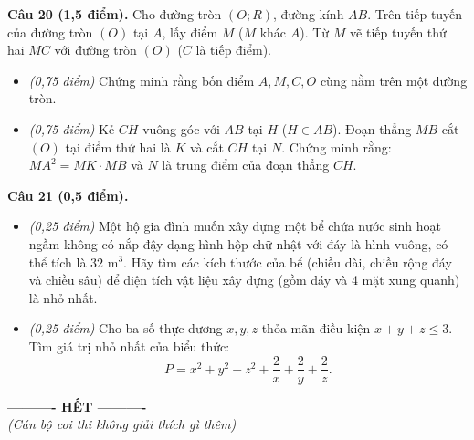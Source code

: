 \documentclass[11pt,a4paper]{article}
\begin{document}
\vspace{2mm}
\textbf{Câu 20 (1,5 điểm).} Cho đường tròn $(O; R)$, đường kính $AB$. Trên tiếp tuyến của đường tròn $(O)$ tại $A$, lấy điểm $M$ ($M$ khác $A$). Từ $M$ vẽ tiếp tuyến thứ hai $MC$ với đường tròn $(O)$ ($C$ là tiếp điểm).
\begin{itemize}
  \item[a)] \textit{(0,75 điểm)} Chứng minh rằng bốn điểm $A, M, C, O$ cùng nằm trên một đường tròn.
  \item[b)] \textit{(0,75 điểm)} Kẻ $CH$ vuông góc với $AB$ tại $H$ ($H \in AB$). Đoạn thẳng $MB$ cắt $(O)$ tại điểm thứ hai là $K$ và cắt $CH$ tại $N$. Chứng minh rằng: $MA^2 = MK \cdot MB$ và $N$ là trung điểm của đoạn thẳng $CH$.
\end{itemize}

\vspace{2mm}
\textbf{Câu 21 (0,5 điểm).}
\begin{itemize}
  \item[a)] \textit{(0,25 điểm)} Một hộ gia đình muốn xây dựng một bể chứa nước sinh hoạt ngầm không có nắp đậy dạng hình hộp chữ nhật với đáy là hình vuông, có thể tích là $32\text{ m}^3$. Hãy tìm các kích thước của bể (chiều dài, chiều rộng đáy và chiều sâu) để diện tích vật liệu xây dựng (gồm đáy và 4 mặt xung quanh) là nhỏ nhất.
  \item[b)] \textit{(0,25 điểm)} Cho ba số thực dương $x, y, z$ thỏa mãn điều kiện $x + y + z \le 3$. Tìm giá trị nhỏ nhất của biểu thức:
  \[
  P = x^2 + y^2 + z^2 + \dfrac{2}{x} + \dfrac{2}{y} + \dfrac{2}{z}.
  \]
\end{itemize}

\vspace{4mm}
\begin{center}
\textbf{---------- HẾT ----------}\\
\textit{(Cán bộ coi thi không giải thích gì thêm)}
\end{center}
\end{document}
